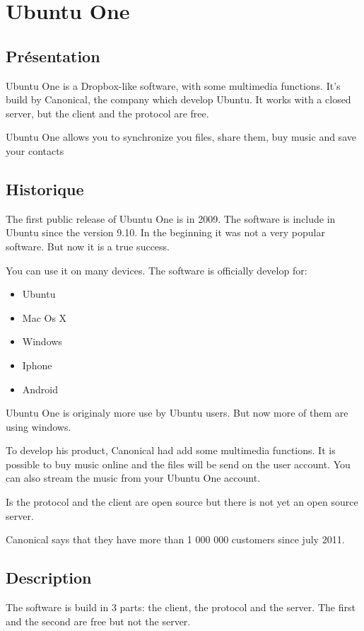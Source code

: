 \section{Ubuntu One}
\thispagestyle{EIP} %
\subsection{Présentation}
Ubuntu One is a Dropbox-like software, with some multimedia functions. It's build by Canonical, the company which develop Ubuntu. It works with a closed server, but the client and the protocol are free.

Ubuntu One allows you to synchronize you files, share them, buy music and save your contacts

\subsection{Historique}
The first public release of Ubuntu One is in 2009. The software is include in Ubuntu since the version 9.10. In the beginning it was not a very popular software. But now it is a true success.

You can use it on many devices. The software is officially develop for: 
\begin{itemize}
\renewcommand{\labelitemi}{$\bullet$}
\item Ubuntu
\item Mac Os X
\item Windows
\item Iphone
\item Android
\end{itemize}

Ubuntu One is originaly more use by Ubuntu users. But now more of them are using windows.

To develop his product, Canonical had add some multimedia functions. It is possible to buy music online and the files will be send on the user account. You can also stream the music from your Ubuntu One account.

Is the protocol and the client are open source but there is not yet an open source server.

Canonical says that they have more than 1 000 000 customers since july 2011.

\subsection{Description}
The software is build in 3 parts: the client, the protocol and the server. The first and the second are free but not the server.

